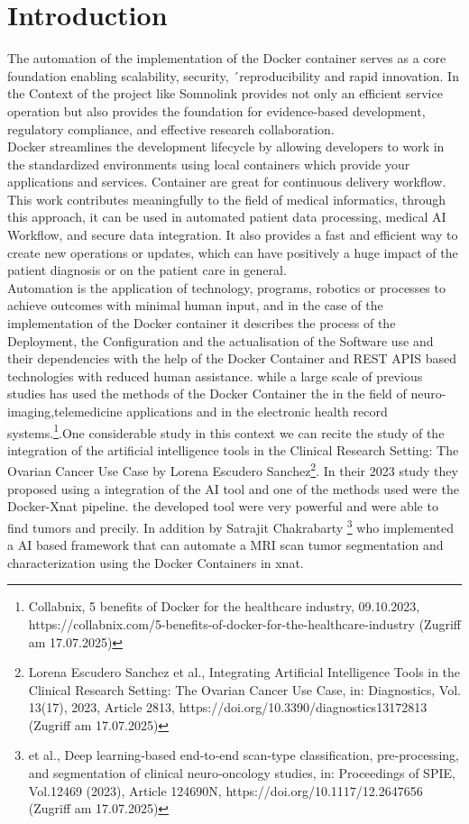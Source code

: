 \chapter{Introduction}

The automation of the implementation of the Docker container serves as a core foundation enabling scalability, security, ´reproducibility and rapid innovation. In the Context of the project like Somnolink provides not only an efficient service operation but also provides the foundation for evidence-based development, regulatory compliance, and effective research collaboration.\\
Docker streamlines the development lifecycle by allowing developers to work in the standardized environments using local containers which provide your applications and services. Container are great for continuous delivery workflow.
This work contributes meaningfully to the field of medical informatics, through this approach, it can be used in automated patient data processing, medical AI Workflow, and secure data integration. It also provides a fast and efficient way to create new operations or updates, which can have positively a huge impact of the patient diagnosis or on the patient care in general.\\Automation is the application of technology, programs, robotics or processes to achieve outcomes with minimal human input, and in the case of the implementation of the Docker container it describes the process of the Deployment, the Configuration and the actualisation of the Software use and their dependencies with the help of the Docker Container and REST APIS based technologies with reduced human assistance. 
while a large scale of previous studies has used the methods of the Docker Container the  in the field of neuro-imaging,telemedicine applications and in the electronic health record systems.\footnote{Collabnix, 5 benefits of Docker for the healthcare industry, 09.10.2023, https://collabnix.com/5-benefits-of-docker-for-the-healthcare-industry (Zugriff am 17.07.2025)}.One considerable study in this context we can recite the study of the integration of the artificial intelligence tools in the Clinical Research Setting: The Ovarian Cancer Use Case by Lorena Escudero Sanchez\footnote{Lorena Escudero Sanchez et al., Integrating Artificial Intelligence Tools in the Clinical Research Setting: The Ovarian Cancer Use Case, in: Diagnostics, Vol. 13(17), 2023, Article 2813, https://doi.org/10.3390/diagnostics13172813 (Zugriff am 17.07.2025)}. In their 2023 study they proposed using a integration of the AI tool and one of the methods used were the Docker-Xnat pipeline. the developed tool were very powerful and were able to find tumors and precily. In addition by Satrajit Chakrabarty \footnote{et al., Deep learning‑based end‑to‑end scan‑type classification, pre‑processing, and segmentation of clinical neuro‑oncology studies, in: Proceedings of SPIE, Vol.12469 (2023), Article 124690N, https://doi.org/10.1117/12.2647656 (Zugriff am 17.07.2025)} who implemented a  AI based framework that can automate a MRI scan tumor segmentation and characterization using the  Docker Containers in xnat.\\ 

